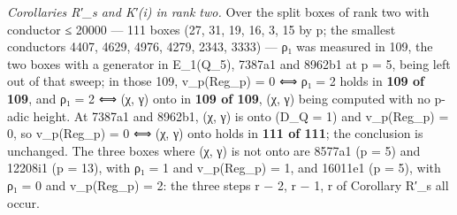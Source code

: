 \documentclass[11pt,a4paper]{article}
\theoremstyle{named}
\begin{document}
\textit{Corollaries R′\_s and K′(i) in rank two.} Over the split boxes of rank two with conductor ≤ 20000 — 111 boxes (27, 31, 19, 16, 3, 15 by p; the smallest conductors 4407, 4629, 4976, 4279, 2343, 3333) — ρ₁ was measured in 109, the two boxes with a generator in E\_1(Q\_5), 7387a1 and 8962b1 at p = 5, being left out of that sweep; in those 109, v\_p(Reg\_p) = 0 ⟺ ρ₁ = 2 holds in \textbf{109 of 109}, and ρ₁ = 2 ⟺ (χ, γ) onto in \textbf{109 of 109}, (χ, γ) being computed with no p-adic height. At 7387a1 and 8962b1, (χ, γ) is onto (D\_Q = 1) and v\_p(Reg\_p) = 0, so v\_p(Reg\_p) = 0 ⟺ (χ, γ) onto holds in \textbf{111 of 111}; the conclusion is unchanged. The three boxes where (χ, γ) is not onto are 8577a1 (p = 5) and 12208i1 (p = 13), with ρ₁ = 1 and v\_p(Reg\_p) = 1, and 16011e1 (p = 5), with ρ₁ = 0 and v\_p(Reg\_p) = 2: the three steps r − 2, r − 1, r of Corollary R′\_s all occur.
\end{document}
